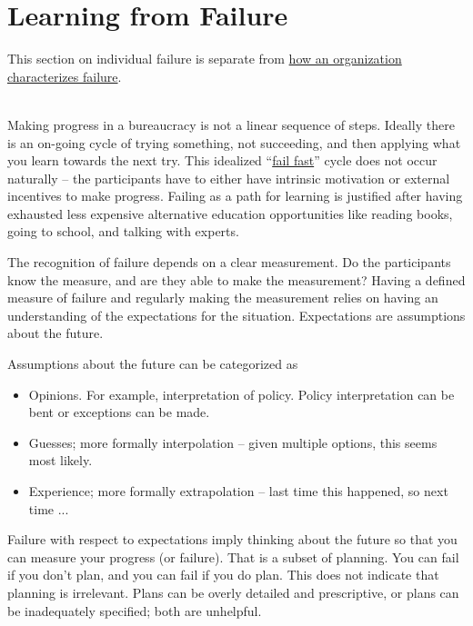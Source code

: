 \section{Learning from Failure\label{sec:learn-from-failure}}

This section on individual failure is separate from
\hyperref[sec:org-failure-and-success]{how an organization characterizes failure}.

\ \\

Making progress in a bureaucracy is not a linear sequence of steps. Ideally there is an on-going cycle of trying something, not succeeding, and then applying what you learn towards the next try. This idealized ``\href{https://en.wikipedia.org/wiki/Fail-fast#Business}{fail fast}'' 
cycle does not occur naturally -- the participants have to either have intrinsic motivation or external incentives to make progress. Failing as a path for learning is justified after having exhausted less expensive alternative education opportunities like reading books, going to school, and talking with experts. 

The recognition of failure depends on a clear measurement. Do the participants know the measure, and are they able to make the measurement? Having a defined measure of failure and regularly making the measurement relies on having an understanding of the expectations for the situation. Expectations are assumptions about the future.

Assumptions about the future can be categorized as
\begin{itemize}
    \item Opinions. For example, interpretation of policy. Policy interpretation can be bent or exceptions can be made. 
    \item Guesses; more formally interpolation -- given multiple options, this seems most likely.
    \item Experience; more formally extrapolation -- last time this happened, so next time ...
\end{itemize}

Failure with respect to expectations imply thinking about the future so that you can measure your progress (or failure). That is a subset of planning. You can fail if you don't plan, and you can fail if you do plan. This does not indicate that planning is irrelevant. Plans can be overly detailed and prescriptive, or plans can be inadequately specified; both are unhelpful.

